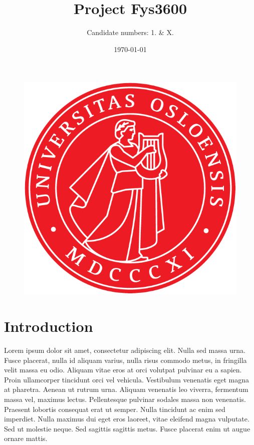 \documentclass[norsk,a4paper,12pt]{article}
\title{Project Fys3600}
\author{Candidate numbers: 1. \& X.}
\date{\today}
\begin{document}
\maketitle

\begin{figure}[H]
\begin{center}
\includegraphics[scale=1.0]{uiosegl.png}
\end{center}
\end{figure}



\newpage

\tableofcontents

\section{Introduction} %
\label{sec:intro}


Lorem ipsum dolor sit amet, consectetur adipiscing elit. Nulla sed massa urna. Fusce placerat, nulla id aliquam varius, nulla risus commodo metus, in fringilla velit massa eu odio. Aliquam vitae eros at orci volutpat pulvinar eu a sapien. Proin ullamcorper tincidunt orci vel vehicula. Vestibulum venenatis eget magna at pharetra. Aenean ut rutrum urna. Aliquam venenatis leo viverra, fermentum massa vel, maximus lectus. Pellentesque pulvinar sodales massa non venenatis. Praesent lobortis consequat erat ut semper. Nulla tincidunt ac enim sed imperdiet. Nulla maximus dui eget eros laoreet, vitae eleifend magna vulputate. Sed ut molestie neque. Sed sagittis sagittis metus. Fusce placerat enim ut augue ornare mattis.
\end{document}
